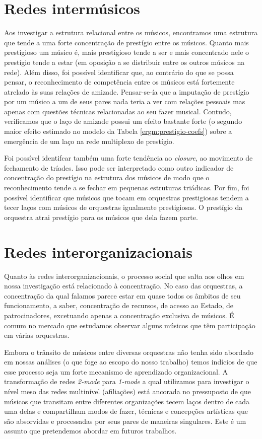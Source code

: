 \documentclass[a4paper, 12pt, openright, oneside, german, french, english, brazil]{abntex2}
\begin{document}
        \section{Redes intermúsicos}

        Aos investigar a estrutura relacional entre os músicos, encontramos uma estrutura que tende a uma forte concentração de prestígio entre os músicos. Quanto mais prestigioso um músico é, mais prestigioso tende a ser e mais concentrado nele o prestígio tende a estar (em oposição a se distribuir entre os outros músicos na rede). Além disso, foi possível identificar que, ao contrário do que se possa pensar, o reconhecimento de competência entre os músicos está fortemente atrelado às suas relações de amizade. Pensar-se-ía que a imputação de prestígio por um músico a um de seus pares nada teria a ver com relações pessoais mas apenas com questões técnicas relacionadas ao seu fazer musical. Contudo, verificamos que o laço de amizade possui um efeito bastante forte (o segundo maior efeito estimado no modelo da Tabela \ref{ergm:prestigio-coefs}) sobre a emergência de um laço na rede multiplexo de prestígio.

        Foi possível identifcar também uma forte tendência ao \textit{closure}, ao movimento de fechamento de tríades. Isso pode ser interpretado como outro indicador de concentração do prestígio na estrutura dos músicos de modo que o reconhecimento tende a se fechar em pequenas estruturas triádicas. Por fim, foi possível identificar que músicos que tocam em orquestras prestigiosas tendem a tecer laços com músicos de orquestras igualmente prestigiosas. O prestígio da orquestra atrai prestígio para os músicos que dela fazem parte.



        \section{Redes interorganizacionais}

        Quanto às redes interorganizacionais, o processo social que salta aos olhos em nossa investigação está relacionado à concentração. No caso das orquestras, a concentração da qual falamos parece estar em quase todos os âmbitos de seu funcionamento, a saber, concentração de recursos, de acesso ao Estado, de patrocinadores, excetuando apenas a concentração exclusiva de músicos. É comum no mercado que estudamos observar alguns músicos que têm participação em várias orquestras. 

        Embora o trânsito de músicos entre diversas orquestras não tenha sido abordado em nossas análises (o que foge ao escopo do nosso trabalho) temos indícios de que esse processo seja um forte mecanismo de aprendizado organizacional.
        A transformação de redes \textit{2-mode} para \textit{1-mode} a qual utilizamos para investigar o nível meso das redes multinível (afiliações) está ancorada no pressuposto de que músicos que transitam entre diferentes organizações tecem laços dentro de cada uma delas e compartilham modos de fazer, técnicas e concepções artísticas que são absorvidas e processadas por seus pares de maneiras singulares. Este é um assunto que pretendemos abordar em futuros trabalhos.
\end{document}

